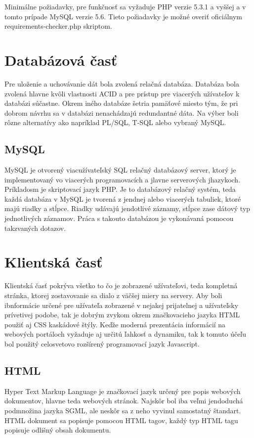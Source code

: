 Minimálne požiadavky, pre funkčnosť sa vyžaduje PHP verzie 5.3.1 a vyššej a v tomto prípade MySQL verzie 5.6. Tieto požiadavky je možné overiť oficiálnym requirements-checker.php skriptom.


\section{Databázová časť}
Pre uloženie a uchovávanie dát bola zvolená relačná databáza. Databáza bola zvolená hlavne kvôli vlastnosti ACID a pre prístup pre viacerých užívateľov k databázi súčastne. Okrem iného databáze šetria pamäťové miesto tým, že pri dobrom návrhu sa v databázi nenachádzajú redundantné dáta. Na výber boli rôzne alternatívy ako napríklad PL/SQL, T-SQL alebo vybraný MySQL.  

\subsection{MySQL}
MySQL je otvorený viacužívateľský SQL relačný databázový server, ktorý je implementovaný vo viacerých programovacích a jlavne serverových jhazykoch. Príkladosm je skriptovací jazyk PHP. Je to databázový relačný systém, teda každá databáza v MySQL je tvorená z jendnej alebo viacerých tabuliek, ktoré majú riadky a stĺpce. Riadky udávajú jendotlivé záznamy, stĺpce zase dátový typ jednotlivých záznamov. Práca s takouto databázou je vykonávaná pomocou takzvaných dotazov.

\section{Klientská časť}
Klientská časť pokrýva všetko to čo je zobrazené užívateľovi, teda kompletná stránka, ktorej zostavovanie sa dialo z väčšej miery na servery. Aby boli ibnformácie určené pre užívateľa zobrazené v nejakej prijatelnej a užívateľsky prívetivej podobe, tak je dobrým zvykom okrem značkovacieho jazyka HTML použiť aj CSS kaskádové štýly. Keďže moderná prezentácia informácií na webových portáloch vyžaduje aj určitú ľahkosť a dynamiku, tak k tomuto účeľu bol použitý celosvetovo rozšírený programovací jazyk Javascript.

\subsection{HTML}
Hyper Text Markup Language je značkovací jazyk určený pre popis webových dokumentov, hlavne teda webových stránok. Najskôr bol iba veľmi jendoduchá podmnožina jazyka SGML, ale neskôr sa z neho vyvinul samostatný štandart. HTML dokument sa popisuje pomocou HTML tagov, každý typ HTML tagu popisuje odlišný obsah dokumentu.  

